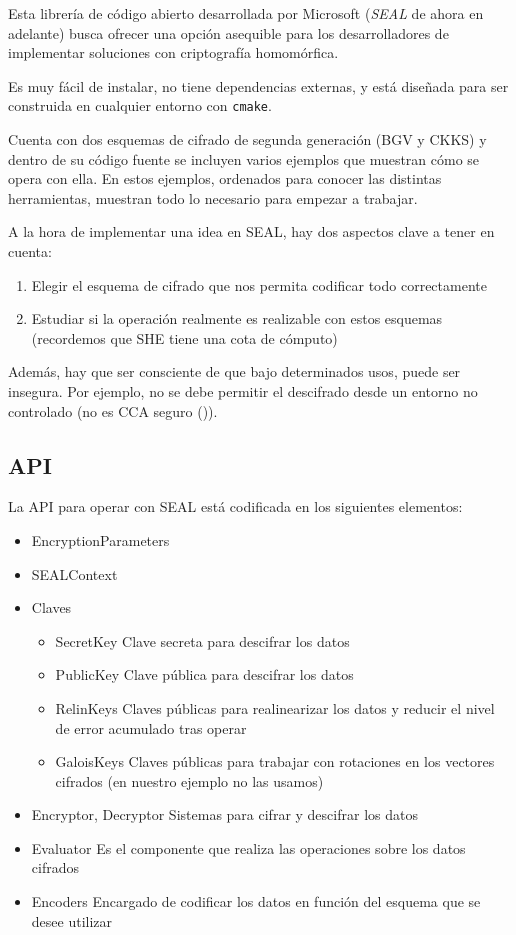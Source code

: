 Esta librería de código abierto desarrollada por Microsoft (\textit{SEAL} de ahora en adelante) busca ofrecer una opción asequible para los desarrolladores de implementar soluciones con criptografía homomórfica.

Es muy fácil de instalar, no tiene dependencias externas, y está diseñada para ser construida en cualquier entorno con \verb|cmake|.

Cuenta con dos esquemas de cifrado de segunda generación (BGV y CKKS) y dentro de su código fuente se incluyen varios ejemplos que muestran cómo se opera con ella. En estos ejemplos, ordenados para conocer las distintas herramientas, muestran todo lo necesario para empezar a trabajar.

A la hora de implementar una idea en SEAL, hay dos aspectos clave a tener en cuenta:

\begin{enumerate}
  \item Elegir el esquema de cifrado que nos permita codificar todo correctamente
  \item Estudiar si la operación realmente es realizable con estos esquemas (recordemos que SHE tiene una cota de cómputo)
\end{enumerate}

Además, hay que ser consciente de que bajo determinados usos, puede ser insegura. Por ejemplo, no se debe permitir el descifrado desde un entorno no controlado (no es CCA seguro (\cite{peng_danger_2019})).

\subsection{API}

La API para operar con SEAL está codificada en los siguientes elementos:

\begin{itemize}
  \item EncryptionParameters
  \item SEALContext
  \item Claves
  \begin{itemize}
    \item SecretKey
    Clave secreta para descifrar los datos
    \item PublicKey
    Clave pública para descifrar los datos
    \item RelinKeys
    Claves públicas para realinearizar los datos y reducir el nivel de error acumulado tras operar
    \item GaloisKeys
    Claves públicas para trabajar con rotaciones en los vectores cifrados (en nuestro ejemplo no las usamos)
  \end{itemize}
  \item Encryptor, Decryptor
  Sistemas para cifrar y descifrar los datos
  \item Evaluator
  Es el componente que realiza las operaciones sobre los datos cifrados
  \item Encoders
  Encargado de codificar los datos en función del esquema que se desee utilizar
\end{itemize}

